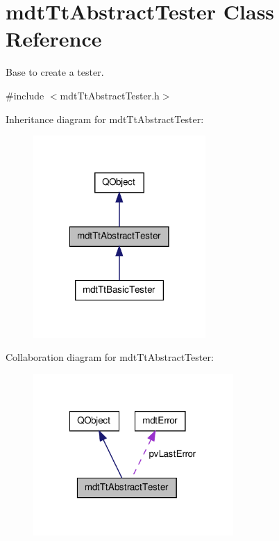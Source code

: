 \hypertarget{classmdt_tt_abstract_tester}{\section{mdt\-Tt\-Abstract\-Tester Class Reference}
\label{classmdt_tt_abstract_tester}
}


Base to create a tester.  




{\ttfamily \#include $<$mdt\-Tt\-Abstract\-Tester.\-h$>$}



Inheritance diagram for mdt\-Tt\-Abstract\-Tester\-:\nopagebreak
\begin{figure}[H]
\begin{center}
\leavevmode
\includegraphics[width=186pt]{classmdt_tt_abstract_tester__inherit__graph}
\end{center}
\end{figure}


Collaboration diagram for mdt\-Tt\-Abstract\-Tester\-:\nopagebreak
\begin{figure}[H]
\begin{center}
\leavevmode
\includegraphics[width=216pt]{classmdt_tt_abstract_tester__coll__graph}
\end{center}
\end{figure}
